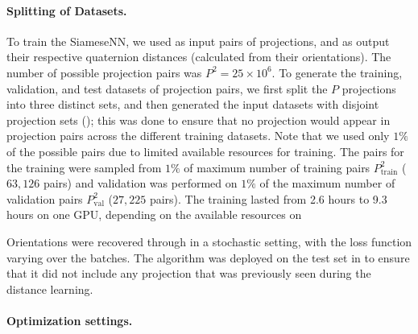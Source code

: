 \paragraph{Splitting of Datasets.}
To train the SiameseNN, we used as input pairs of projections, and as output their respective quaternion distances (calculated from their orientations).
The number of possible projection pairs was $P^2 = 25 \times 10^6$. To generate the training, validation, and test datasets of projection pairs, we first split the $P$ projections into three distinct sets, and then generated the input datasets with disjoint projection sets (); this was done to ensure that no projection would appear in projection pairs across the different training datasets. 
 Note that we used only $1\%$ of the possible pairs due to limited available resources for training.  The pairs for the training were sampled from $1\%$ of maximum number of training pairs $P_{\text{train}}^2$ ($63,126$ pairs) and validation was performed on $1\%$ of the maximum number of validation pairs $P_{\text{val}}^2$ ($27,225$ pairs).  The training lasted from 2.6 hours to 9.3 hours on one GPU, depending on the available resources on  

Orientations were recovered through  in a stochastic setting, with the loss function varying over the batches. The algorithm was deployed on the test set in  to ensure that it did not include any projection that was previously seen during the distance learning. 

\paragraph{Optimization settings.}

